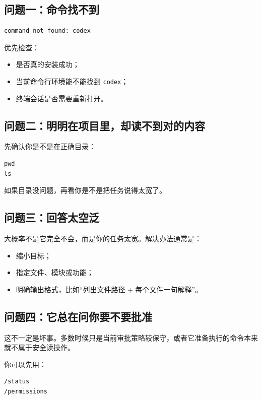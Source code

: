 \documentclass[UTF8,a4paper,12pt]{ctexart}
\begin{document}
\subsection{问题一：命令找不到}

\begin{lstlisting}[style=cli]
command not found: codex
\end{lstlisting}

优先检查：
\begin{itemize}
  \item 是否真的安装成功；
  \item 当前命令行环境能不能找到 \texttt{codex}；
  \item 终端会话是否需要重新打开。
\end{itemize}

\subsection{问题二：明明在项目里，却读不到对的内容}

先确认你是不是在正确目录：

\begin{lstlisting}[style=cli]
pwd
ls
\end{lstlisting}

如果目录没问题，再看你是不是把任务说得太宽了。

\subsection{问题三：回答太空泛}

大概率不是它完全不会，而是你的任务太宽。解决办法通常是：
\begin{itemize}
  \item 缩小目标；
  \item 指定文件、模块或功能；
  \item 明确输出格式，比如“列出文件路径 + 每个文件一句解释”。
\end{itemize}

\subsection{问题四：它总在问你要不要批准}

这不一定是坏事。多数时候只是当前审批策略较保守，或者它准备执行的命令本来就不属于安全读操作。

你可以先用：

\begin{lstlisting}[style=cli]
/status
/permissions
\end{lstlisting}
\end{document}
